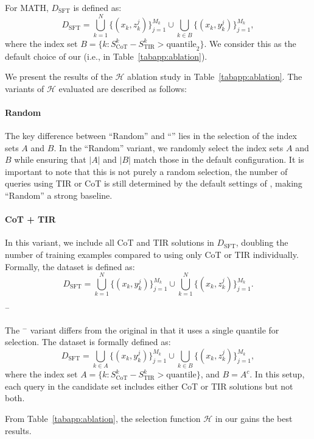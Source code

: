 For MATH, $D_{\text{SFT}}$ is defined as:  
$$
D_{\text{SFT}} = \bigcup_{k=1}^N \{(x_k, z_k^j)\}_{j=1}^{M_k} \cup \bigcup_{k \in B} \{(x_k, y_k^j)\}_{j=1}^{M_k},
$$  
where the index set $B = \{k: S_{\text{CoT}}^k - S_{\text{TIR}}^k > \text{quantile}_2\}$.  
We consider this as the default choice of our {\method} (i.e., {\method} in Table~\ref{tabapp:ablation}).

We present the results of the $\mathcal{H}$ ablation study in Table~\ref{tabapp:ablation}. The variants of $\mathcal{H}$ evaluated are described as follows:

\paragraph{Random} 
The key difference between ``Random'' and ``{\method}'' lies in the selection of the index sets $A$ and $B$. 
In the ``Random'' variant, we randomly select the index sets $A$ and $B$ while ensuring that $|A|$ and $|B|$ match those in the default {\method} configuration. 
It is important to note that this is not purely a random selection, the number of queries using TIR or CoT is still determined by the default settings of {\method}, making ``Random'' a strong baseline.


\paragraph{CoT + TIR}
 In this variant, we include all CoT and TIR solutions in $D_{\text{SFT}}$, doubling the number of training examples compared to using only CoT or TIR individually. 
 Formally, the dataset is defined as:  
$$
D_{\text{SFT}} = \bigcup_{k=1}^N \{(x_k, y_k^j)\}_{j=1}^{M_k} \cup \bigcup_{k=1}^N \{(x_k, z_k^j)\}_{j=1}^{M_k}.
$$  


\paragraph{\method$^-$}
The {\method}$^-$ variant differs from the original {\method} in that it uses a single quantile for selection. 
The dataset is formally defined as:  
$$
D_{\text{SFT}} = \bigcup_{k \in A} \{(x_k, y_k^j)\}_{j=1}^{M_k} \cup \bigcup_{k \in B} \{(x_k, z_k^j)\}_{j=1}^{M_k},
$$  
where the index set $A = \{k: S_{\text{CoT}}^k - S_{\text{TIR}}^k > \text{quantile}\}$, and $B = A^c$.  
In this setup, each query in the candidate set {\dcandidatee} includes either CoT or TIR solutions but not both.


From Table~\ref{tabapp:ablation}, the selection function $\mathcal{H}$ in our {\method} gains the best results.


